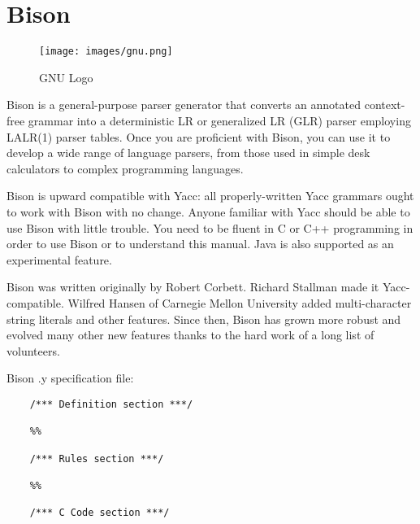\section{Bison}

\begin{figure}[h]
	\centering \texttt{[image: images/gnu.png]}
	\caption{GNU Logo}
	\label{fig:gnu}
\end{figure}

Bison is a general-purpose parser generator that converts an annotated context-free grammar into a deterministic LR or generalized LR (GLR) parser employing LALR(1) parser
tables.
Once you are proficient with Bison, you can use it to develop a wide range of language parsers, from those used in simple desk calculators to complex programming languages.


Bison is upward compatible with Yacc: all properly-written Yacc grammars ought to work with Bison with no change. Anyone familiar with Yacc should be able to use Bison with little trouble. You need to be fluent in C or C++ programming in order to use Bison
or to understand this manual. Java is also supported as an experimental feature.


Bison was written originally by Robert Corbett. Richard Stallman made it Yacc-compatible. Wilfred Hansen of Carnegie Mellon University added multi-character string literals and other features. Since then, Bison has grown more robust and evolved many
other new features thanks to the hard work of a long list of volunteers.

Bison .y specification file:

\begin{verbatim}
	/*** Definition section ***/
	
	%%
	
	/*** Rules section ***/
	
	%%
	
	/*** C Code section ***/

\end{verbatim}
